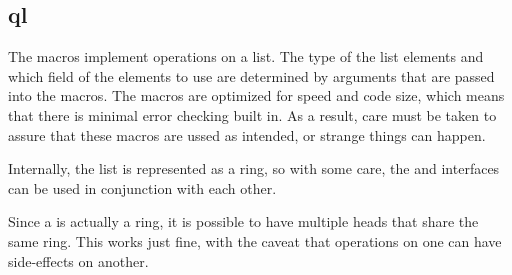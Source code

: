 %
%
%
%
%              

\subsection{ql}
\label{ql}

The  macros implement operations on a list.  The type of the list
elements and which field of the elements to use are determined by arguments that
are passed into the macros.  The macros are optimized for speed and code size,
which means that there is minimal error checking built in.  As a result, care
must be taken to assure that these macros are ussed as intended, or strange
things can happen.

Internally, the list is represented as a ring, so with some care, the
 and  interfaces can be used in conjunction with
each other.

Since a  is actually a ring, it is possible to have multiple
 heads that share the same ring.  This works just fine, with the
caveat that operations on one  can have side-effects on another.


